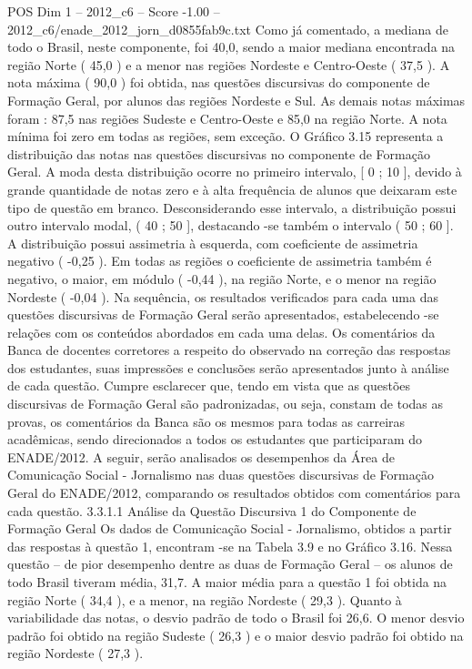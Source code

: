 \begin{textsample}{POS Dim 1 – 2012\_c6 – Score -1.00 – 2012\_c6/enade\_2012\_jorn\_d0855fab9c.txt}
Como já comentado, a mediana de todo o Brasil, neste componente, foi 40,0, sendo a maior mediana encontrada na região Norte ( 45,0 ) e a menor nas regiões Nordeste e Centro-Oeste ( 37,5 ).
A nota máxima ( 90,0 ) foi obtida, nas questões discursivas do componente de Formação Geral, por alunos das regiões Nordeste e Sul.
As demais notas máximas foram : 87,5 nas regiões Sudeste e Centro-Oeste e 85,0 na região Norte.
A nota mínima foi zero em todas as regiões, sem exceção.
O Gráfico 3.15 representa a distribuição das notas nas questões discursivas no componente de Formação Geral.
A moda desta distribuição ocorre no primeiro intervalo, [ 0 ; 10 ], devido à grande quantidade de notas zero e à alta frequência de alunos que deixaram este tipo de questão em branco.
Desconsiderando esse intervalo, a distribuição possui outro intervalo modal, ( 40 ; 50 ], destacando -se também o intervalo ( 50 ; 60 ].
A distribuição possui assimetria à esquerda, com coeficiente de assimetria negativo ( -0,25 ).
Em todas as regiões o coeficiente de assimetria também é negativo, o maior, em módulo ( -0,44 ), na região Norte, e o menor na região Nordeste ( -0,04 ).
Na sequência, os resultados verificados para cada uma das questões discursivas de Formação Geral serão apresentados, estabelecendo -se relações com os conteúdos abordados em cada uma delas.
Os comentários da Banca de docentes corretores a respeito do observado na correção das respostas dos estudantes, suas impressões e conclusões serão apresentados junto à análise de cada questão.
Cumpre esclarecer que, tendo em vista que as questões discursivas de Formação Geral são padronizadas, ou seja, constam de todas as provas, os comentários da Banca são os mesmos para todas as carreiras acadêmicas, sendo direcionados a todos os estudantes que participaram do ENADE/2012.
A seguir, serão analisados os desempenhos da Área de Comunicação Social - Jornalismo nas duas questões discursivas de Formação Geral do ENADE/2012, comparando os resultados obtidos com comentários para cada questão. 3.3.1.1 Análise da Questão Discursiva 1 do Componente de Formação Geral Os dados de Comunicação Social - Jornalismo, obtidos a partir das respostas à questão 1, encontram -se na Tabela 3.9 e no Gráfico 3.16.
Nessa questão – de pior desempenho dentre as duas de Formação Geral – os alunos de todo Brasil tiveram média, 31,7.
A maior média para a questão 1 foi obtida na região Norte ( 34,4 ), e a menor, na região Nordeste ( 29,3 ).
Quanto à variabilidade das notas, o desvio padrão de todo o Brasil foi 26,6.
O menor desvio padrão foi obtido na região Sudeste ( 26,3 ) e o maior desvio padrão foi obtido na região Nordeste ( 27,3 ).

\end{textsample}
